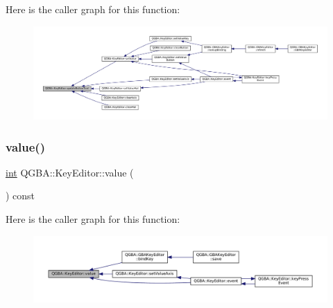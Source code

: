 Here is the caller graph for this function\+:
\nopagebreak
\begin{figure}[H]
\begin{center}
\leavevmode
\includegraphics[width=350pt]{class_q_g_b_a_1_1_key_editor_a4c8a2961a38921ab2bbbf0bd3b763614_icgraph}
\end{center}
\end{figure}
\mbox{\label{class_q_g_b_a_1_1_key_editor_a6065db62f1781bf111e5133e2f0948ce}} 
\subsubsection{\texorpdfstring{value()}{value()}}
{\footnotesize\ttfamily \mbox{\hyperlink{ioapi_8h_a787fa3cf048117ba7123753c1e74fcd6}{int}} Q\+G\+B\+A\+::\+Key\+Editor\+::value (\begin{DoxyParamCaption}{ }\end{DoxyParamCaption}) const\hspace{0.3cm}{\ttfamily [inline]}}

Here is the caller graph for this function\+:
\nopagebreak
\begin{figure}[H]
\begin{center}
\leavevmode
\includegraphics[width=350pt]{class_q_g_b_a_1_1_key_editor_a6065db62f1781bf111e5133e2f0948ce_icgraph}
\end{center}
\end{figure}
\mbox{\label{class_q_g_b_a_1_1_key_editor_a060ef43bb32ff534083db12143ffad02}} 
